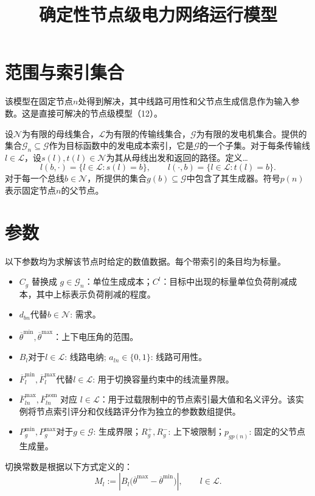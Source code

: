 \documentclass{article}
\title{确定性节点级电力网络运行模型}
\author{}
\date{}
\begin{document}
\maketitle

\section*{范围与索引集合}
该模型在固定节点$n$处得到解决，其中线路可用性和父节点生成信息作为输入参数。这是直接可解决的节点级模型（12）。

设$\mathcal N$为有限的母线集合，$\mathcal L$为有限的传输线集合，$\mathcal G$为有限的发电机集合。提供的集合$\mathcal G_n\subseteq\mathcal G$作为目标函数中的发电成本索引，它是$\mathcal G$的一个子集。对于每条传输线$l\in\mathcal L$，设$s(l),t(l)\in\mathcal N$为其从母线出发和返回的路径。定义…
\[
 l(b,\cdot)=\{l\in\mathcal L:s(l)=b\},\qquad
 l(\cdot,b)=\{l\in\mathcal L:t(l)=b\}.
\]
对于每一个总线$b\in\mathcal N$，所提供的集合$g(b)\subseteq\mathcal G$中包含了其生成器。符号$p(n)$表示固定节点$n$的父节点。

\section*{参数}
以下参数均为求解该节点时给定的数值数据。每个带索引的条目均为标量。
\begin{itemize}
\item $C_g$ 替换成 $g\in\mathcal G_n$：单位生成成本；$C^l$：目标中出现的标量单位负荷削减成本，其中上标表示负荷削减的程度。
\item $d_{bn}$代替$b\in\mathcal N$: 需求。
\item $\overline\theta^{\min},\overline\theta^{\max}$：上下电压角的范围。
\item $B_l$对于$l\in\mathcal L$: 线路电纳; $a_{ln}\in\{0,1\}$: 线路可用性。
\item $\overline F_l^{\min},\overline F_l^{\max}$代替$l\in\mathcal L$: 用于切换容量约束中的线流量界限。
\item $\overline F_{ln}^{\max},\overline F_{ln}^{\mathrm{nom}}$ 对应 $l\in\mathcal L$：用于过载限制中的节点索引最大值和名义评分。该实例将节点索引评分和仅线路评分作为独立的参数数组提供。
\item $P_g^{\min},P_g^{\max}$对于$g\in\mathcal G$: 生成界限；$R_g^+,R_g^-$: 上下坡限制；$p_{g p(n)}$: 固定的父节点生成量。
\end{itemize}
切换常数是根据以下方式定义的：
\[
M_l:=\left|B_l\bigl(\overline\theta^{\max}-\overline\theta^{\min}\bigr)\right|,
\qquad l\in\mathcal L.
\]
\end{document}
